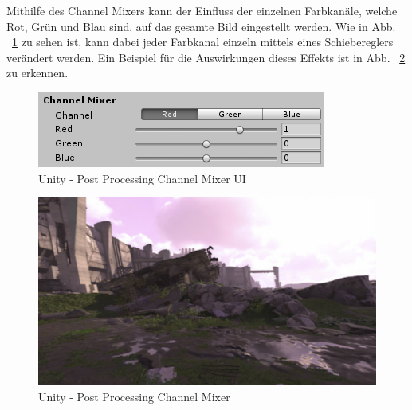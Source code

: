 Mithilfe des Channel Mixers kann der Einfluss der einzelnen Farbkanäle, welche Rot, Grün und Blau sind, auf das gesamte Bild eingestellt werden.
Wie in Abb. ~\ref{fig:unity-post-processing-channel-mixer-ui} zu sehen ist, kann dabei jeder Farbkanal einzeln mittels eines Schiebereglers verändert werden.
Ein Beispiel für die Auswirkungen dieses Effekts ist in Abb. ~\ref{fig:unity-post-processing-channel-mixer} zu erkennen.
\begin {figure}
    \centering
    \includegraphics[scale=0.9]{pics/unity-post-processing-channel-mixer-ui}
    \caption{Unity - Post Processing Channel Mixer UI}
    \label{fig:unity-post-processing-channel-mixer-ui}
\end {figure}

\begin {figure}
    \centering
    \includegraphics[scale=0.4]{pics/unity-post-processing-channel-mixer-example}
    \caption{Unity - Post Processing Channel Mixer}
    \label{fig:unity-post-processing-channel-mixer}
\end {figure}

